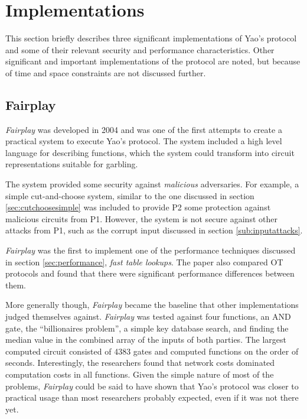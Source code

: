\section{Implementations}
\label{sec:implementations}

This section briefly describes three significant implementations of Yao's protocol and some of their relevant security and performance characteristics. Other significant and important implementations of the protocol are noted\cite{nielsen2009lego}, but because of time and space constraints are not discussed further.

\subsection{Fairplay}

\emph{Fairplay}\cite{malkhi2004fairplay} was developed in 2004 and was one of the first attempts to create a practical system to execute Yao's protocol.  The system included a high level language for describing functions, which the system could transform into circuit representations suitable for garbling.

The system provided some security against \emph{malicious} adversaries.  For example, a simple cut-and-choose system, similar to the one discussed in section \ref{sec:cutchoosesimple} was included to provide \ac{P2} some protection against malicious circuits from \ac{P1}.  However, the system is not secure against other attacks from \ac{P1}, such as the corrupt input discussed in section \ref{sub:inputattacks}.

\emph{Fairplay} was the first to implement one of the performance techniques discussed in section \ref{sec:performance}, \emph{fast table lookups}.  The paper also compared \ac{OT} protocols and found that there were significant performance differences between them.

More generally though, \emph{Fairplay} became the baseline that other implementations judged themselves against. \emph{Fairplay} was tested against four functions, an AND gate, the ``billionaires problem'', a simple key database search, and finding the median value in the combined array of the inputs of both parties.  The largest computed circuit consisted of 4383 gates and computed functions on the order of seconds.  Interestingly, the researchers found that network costs dominated computation costs in all functions. Given the simple nature of most of the problems, \emph{Fairplay} could be said to have shown that Yao's protocol was closer to practical usage than most researchers probably expected, even if it was not there yet.

